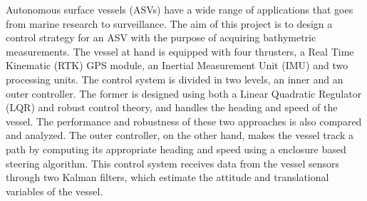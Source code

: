 Autonomous surface vessels (ASVs) have a wide range of applications that goes from marine research to surveillance. The aim of this project is to design a control strategy for an ASV with the purpose of acquiring bathymetric measurements. The vessel at hand is equipped with four thrusters, a Real Time Kinematic (RTK) GPS module, an Inertial Measurement Unit (IMU) and two processing units. The control system is divided in two levels, an inner and an outer controller. The former is designed using both a Linear Quadratic Regulator (LQR) and robust control theory, and handles the heading and speed of the vessel. The performance and robustness of these two approaches is also compared and analyzed. The outer controller, on the other hand, makes the vessel track a path by computing its appropriate heading and speed using a enclosure based steering algorithm. This control system receives data from the vessel sensors through two Kalman filters, which estimate the attitude and translational variables of the vessel.